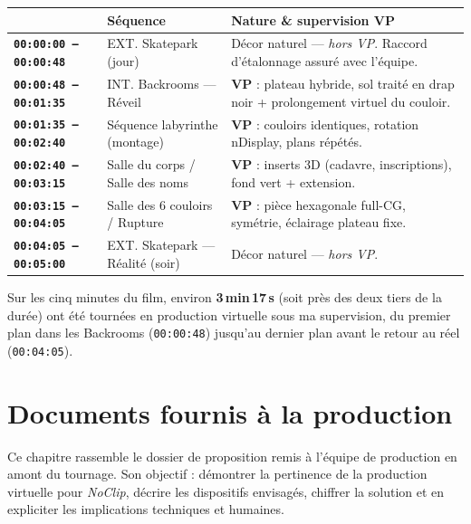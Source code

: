 \documentclass[11pt,a4paper]{report}
\newcommand{\tc}[1]{\texttt{\color{braccent}#1}}  %
\begin{document}
\begin{center}
\begin{tabularx}{\textwidth}{>{\bfseries}p{2.6cm} >{\RaggedRight\arraybackslash}p{4.3cm} Y}
\toprule
{} & \textbf{Séquence} & \textbf{Nature \& supervision VP} \\
\midrule
\tc{00:00:00 -- 00:00:48} & EXT. Skatepark (jour) & Décor naturel --- \textit{hors VP}. Raccord d'étalonnage assuré avec l'équipe. \\
\tc{00:00:48 -- 00:01:35} & INT. Backrooms --- Réveil & \textbf{VP} : plateau hybride, sol traité en drap noir + prolongement virtuel du couloir. \\
\tc{00:01:35 -- 00:02:40} & Séquence labyrinthe (montage) & \textbf{VP} : couloirs identiques, rotation nDisplay, plans répétés. \\
\tc{00:02:40 -- 00:03:15} & Salle du corps / Salle des noms & \textbf{VP} : inserts 3D (cadavre, inscriptions), fond vert + extension. \\
\tc{00:03:15 -- 00:04:05} & Salle des 6 couloirs / Rupture & \textbf{VP} : pièce hexagonale full-CG, symétrie, éclairage plateau fixe. \\
\tc{00:04:05 -- 00:05:00} & EXT. Skatepark --- Réalité (soir) & Décor naturel --- \textit{hors VP}. \\
\bottomrule
\end{tabularx}
\end{center}

\begin{infobox}[title={Périmètre supervisé}]
Sur les cinq minutes du film, environ \textbf{3\,min\,17\,s} (soit près des deux tiers de la durée) ont été tournées en production virtuelle sous ma supervision, du premier plan dans les Backrooms (\tc{00:00:48}) jusqu'au dernier plan avant le retour au réel (\tc{00:04:05}).
\end{infobox}

\chapter{Documents fournis à la production}
Ce chapitre rassemble le dossier de proposition remis à l'équipe de production en amont du tournage. Son objectif : démontrer la pertinence de la production virtuelle pour \textit{NoClip}, décrire les dispositifs envisagés, chiffrer la solution et en expliciter les implications techniques et humaines.
\end{document}
